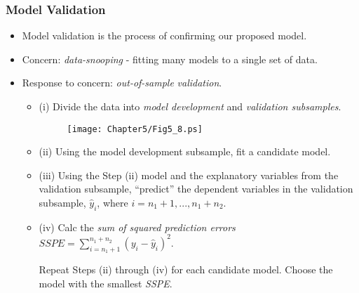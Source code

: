 \begin{frame}[shrink=10]
 \frametitle{Model Validation}
 \begin{itemize}
   \item Model validation is the process of confirming our proposed
model.
\item Concern: \emph{data-snooping} - fitting many models to a single
set of data.
\item Response to concern: \textit{out-of-sample} \textit{validation}.
\begin{itemize}
\item (i) Divide the data into \emph{model development} and \emph{validation
subsamples}.
\begin{figure}[htp]
  \begin{center}
    \texttt{[image: Chapter5/Fig5\_8.ps]}
  \end{center}
\end{figure}
\item  (ii) Using the model development subsample, fit a candidate model.
\item  (iii) Using the  Step (ii) model and the explanatory variables
from the validation subsample, ``predict'' the dependent variables
in the validation subsample, $\hat{y}_i$, where
$i=n_{1}+1,...,n_{1}+n_{2}$.
\item (iv) Calc the \textit{sum of squared prediction errors}
$SSPE=\sum_{i=n_{1}+1}^{n_{1}+n_{2}}(y_{i}-\hat{y}_{i})^{2}$.

Repeat Steps (ii) through (iv) for each candidate model. Choose the
model with the smallest \textit{SSPE}.
 \end{itemize}
    \end{itemize}
\end{frame}

